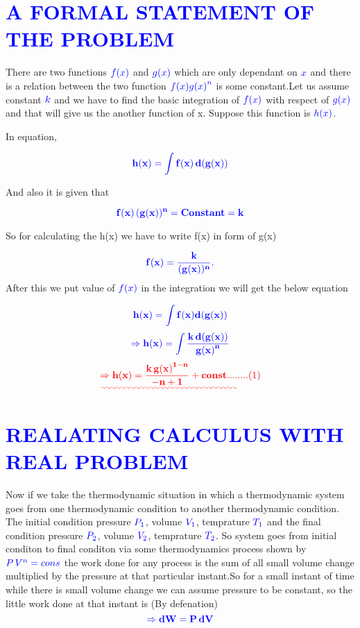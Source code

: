 \documentclass[12pt]{article}
\begin{document}
\section{\textcolor{blue}{ A FORMAL STATEMENT OF THE PROBLEM }}
\textsf
There are two functions $\textcolor{blue}{ f(x) }$ and $\textcolor{blue}{ g(x) }$ which are only dependant on $\textcolor{blue}{ x }$ and there is a relation between the two function $\textcolor{blue}{ f(x){g(x)}^n }$ is some constant.Let us assume constant $\textcolor{blue}{ k }$ and we have to find the basic integration of $\textcolor{blue}{ f(x) }$ with respect of $\textcolor{blue}{ g(x) }$ and that will give us the another function of x.
Suppose this function is $\textcolor{blue}{ h(x) }$.




In equation,

\[
\textcolor{blue}
{
\mathbf
 {h(x) = \int{f(x)\,d(g(x))}}
}
\]

And also it is given that

\[
\textcolor{blue}
 {
\mathbf{f(x)\,(g(x))^n = Constant = k}
 }
\]

So for calculating the h(x) we have to write f(x) in form of g(x)

\[
\textcolor{blue}
{
\mathbf
{f(x)=\frac{k}{(g(x))^n}}.
}
\]
After this we put value of $\textcolor{blue} {f(x) } $ in the integration we will get the below equation

\[
\textcolor{blue}
{
\mathbf
{h(x)=\int{f(x)d(g(x))}}
}
\]
\vspace{1cm}
\[
\textcolor{blue}
{
\mathbf
{\Rightarrow h(x)=\int{\frac{k\,d(g(x))}{{g(x)}^n}}}
}
\]
\vspace{1cm}
\[
\textcolor{red}
{
\mathbf
{\uwave
{\Rightarrow  h(x)={\frac{k\,{g(x)}^{1-n}}{{-n+1}}} + const   ....}}  ....(1)
}
\]

\large
\section{\textcolor{blue}{REALATING CALCULUS WITH REAL PROBLEM}}
\textsf
Now if we take the thermodynamic situation in which a thermodynamic system goes from one thermodynamic condition to another thermodynamic condition.
\\The initial condition pressure $\textcolor{blue}{ P_1 }$, volume $\textcolor{blue}{  V_1 }$, temprature $\textcolor{blue}{   T_1 }$ and the final condition pressure $\textcolor{blue}{ P_2 }$, volume $\textcolor{blue}{  V_2 }$, temprature $\textcolor{blue}{   T_2 }$. So system goes from initial conditon to final conditon via some thermodynamics process shown by $\textcolor{blue}{  P\,V^n=cons }$ the work done for any process is the sum of all small volume change multiplied by the pressure at that particular instant.So for a small instant of time while there is small volume change we can assume pressure to be constant, so the little work done at that instant is (By defenation)
\[
\textcolor{blue}
{
\mathbf
{\Rightarrow dW = P\,dV}
}
\]
\end{document}
